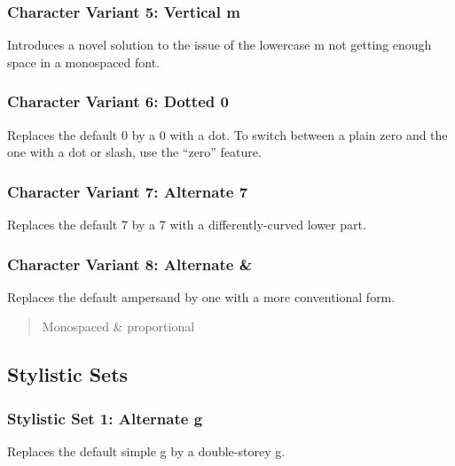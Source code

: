 \subsubsection{Character Variant 5: Vertical m}
Introduces a novel solution to the issue of the lowercase m not getting enough space in a monospaced font.
\begin{quote}
{ \sample}
\end{quote}

\subsubsection{Character Variant 6: Dotted 0}
Replaces the default 0 by a 0 with a dot. To switch between a plain zero and the one with a dot or slash, use the “zero” feature.
\begin{quote}
{ \sample}
\end{quote}

\subsubsection{Character Variant 7: Alternate 7}
Replaces the default 7 by a 7 with a differently-curved lower part.
\begin{quote}
{ \sample}
\end{quote}

\subsubsection{Character Variant 8: Alternate \&}
Replaces the default ampersand by one with a more conventional form.
\begin{quote}
{ Monospaced \& proportional}
\end{quote}

\subsection{Stylistic Sets}

\subsubsection{Stylistic Set 1: Alternate g}
Replaces the default simple g by a double-storey g.
\begin{quote}
{ \sample}
\end{quote}

